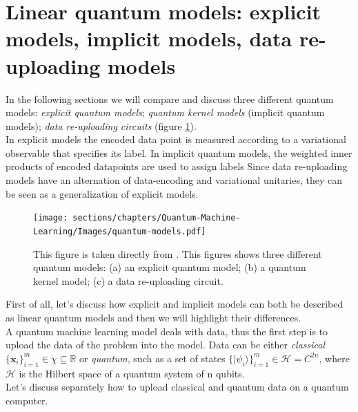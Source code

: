 \section{Linear quantum models: explicit models, implicit models, data re-uploading models}

In the following sections we will compare and discuss three different quantum models: \textit{explicit quantum models}; 
\textit{quantum kernel models} (implicit quantum models); \textit{data re-uploading circuits} 
(figure \ref{fig:quantum-models}).\\
In explicit models the encoded data point is measured according to a variational observable that specifies its label.
In implicit quantum models, the weighted inner products of encoded datapoints are used to assign labels
Since data re-uploading models have an alternation of data-encoding and variational unitaries, they 
can be seen as a generalization of explicit models.


\begin{figure}[h]
    \centering
    \texttt{[image: sections/chapters/Quantum-Machine-Learning/Images/quantum-models.pdf]}
    \caption{This figure is taken directly from \cite{Jerbi_2023}. This figures shows three different quantum models:
    (a) an explicit quantum model; (b) a quantum kernel model; (c) a data re-uploading circuit.}
    \label{fig:quantum-models}
\end{figure}

First of all, let's discuss how explicit and implicit models can both be described as linear quantum models and then
we will highlight their differences.\\
A quantum machine learning model deals with data, thus the first step is to upload the data of the 
problem into the model.
Data can be either \textit{classical} $\{\bm{x}_i\}_{i=1}^m \in \chi \subseteq \mathbb{R}$ 
or \textit{quantum}, such as a set of states $\{ |\psi_i\rangle \}_{i=1}^m \in \mathcal{H} = C^{2n}$, 
where $\mathcal{H}$ is the Hilbert space of a quantum system of n qubits.\\
Let's discuss separately how to upload classical and quantum data on a quantum computer.

